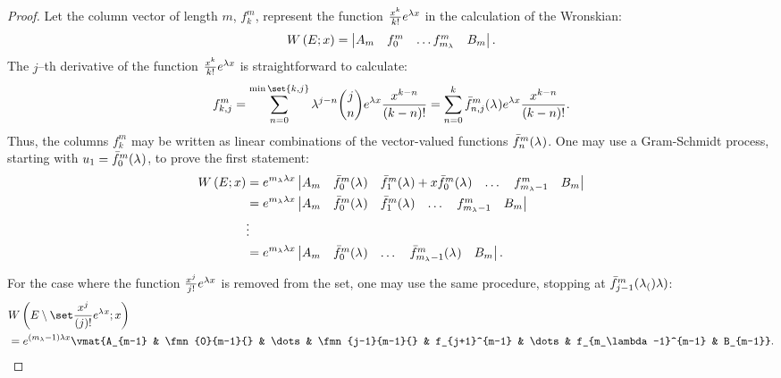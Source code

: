 \documentclass{article}
\begin{document}
\begin{proof}
Let the column vector of length $m$, $f_k^m$, represent the function $\Poly{k} e^{\lambda x}$ in the calculation of the Wronskian:
\begin{equation*}
\W{E}{x} = \begin{vmatrix} A_m & f_0^m & \dots f_{m_\lambda}^m & B_m \end{vmatrix} .
\end{equation*}
The $j$--th derivative of the function $\Poly{k} e^{\lambda x}$ is straightforward to calculate:
\begin{equation*}
f_{k,j}^m = \sum_{n=0}^{\min \set{k,j}} \lambda^{j-n} \binom{j}{n} e^{\lambda x} \poly{k-n} = \sum_{n=0}^k \fmn{n,j}{m}{} e^{\lambda x} \poly{k-n}.
\end{equation*}
Thus, the columns $f_k^m$ may be written as linear combinations of the vector-valued functions $\fmn{n}{m}{}$.
One may use a Gram-Schmidt process, starting with $u_1 = \fmn{0}{m}{}$, to prove the first statement:
\begin{equation*}
\begin{split}
\W{E}{x} & = e^{m_\lambda \lambda x} \begin{vmatrix} A_m & \fmn{0}{m}{} & \fmn{1}{m}{} + x \fmn{0}{m}{} & \dots & f_{m_\lambda-1}^m & B_m \end{vmatrix} \\
& = e^{m_\lambda \lambda x} \begin{vmatrix} A_m & \fmn{0}{m}{} & \fmn{1}{m}{} & \dots & f_{m_\lambda-1}^m & B_m \end{vmatrix} \\
& \vdots \\
& = e^{m_\lambda \lambda x} \begin{vmatrix} A_m & \fmn{0}{m}{} & \dots & \fmn{m_\lambda-1}{m}{} & B_m \end{vmatrix} .
\end{split}
\end{equation*}

For the case where the function $\Poly{j} e^{\lambda x}$ is removed from the set, one may use the same procedure, stopping at $\fmn{j-1}{m}(\lambda)$:
\begin{align*}
& \Wspec{j}{} \\
& = \eone \vmat{A_{m-1} & \fmn{0}{m-1}{} & \dots & \fmn{j-1}{m-1}{} & f_{j+1}^{m-1} & \dots & f_{m_\lambda-1}^{m-1} & B_{m-1}} .
\end{align*}


\end{proof}
\end{document}
